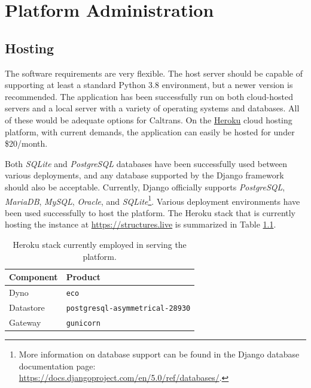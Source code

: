\begingroup 


\chapter{Platform Administration}\label{sec:administration}

\section{Hosting}
The software requirements are very flexible. The host server should be capable of supporting at least a standard Python 3.8 environment, but a newer version is recommended. The application has been successfully run on both cloud-hosted servers and a local server with a variety of operating systems and databases. All of these would be adequate options for Caltrans. On the \href{https://www.heroku.com}{Heroku} cloud hosting platform, with current demands, the application can easily be hosted for under \$20/month.

Both \emph{SQLite} and \emph{PostgreSQL} databases have been successfully used between various deployments, and any database supported by the Django framework should also be acceptable. 
Currently, Django officially supports \emph{PostgreSQL}, \emph{MariaDB}, \emph{MySQL}, \emph{Oracle}, and \emph{SQLite}{\footnote{More information on database support can be found in the Django database documentation page:  \url{https://docs.djangoproject.com/en/5.0/ref/databases/}.}}. Various deployment environments have been used successfully to host the platform. The Heroku stack that is currently hosting the instance at \url{https://structures.live} is summarized in Table \ref{tab:heroku-stack}. 
\begin{table}[h!]
    \centering
    \caption{Heroku stack currently employed in serving the \BRACE{} platform.}
    \begin{tabular}{ll}
    \toprule
        {\bf{Component}} & {\bf{Product}} \\ \hline
         Dyno & \texttt{eco} \\
         Datastore &  \texttt{postgresql-asymmetrical-28930} \\
         Gateway & \texttt{gunicorn } \\
    \bottomrule
    \end{tabular}
    \label{tab:heroku-stack}
\end{table}

